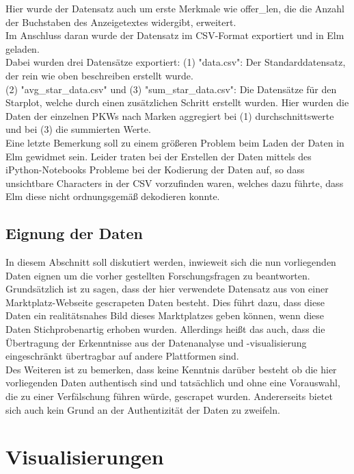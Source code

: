 \documentclass[usegeometry=true]{scrartcl}
\begin{document}
Hier wurde der Datensatz auch um erste Merkmale wie offer_len, die die Anzahl der Buchstaben des Anzeigetextes widergibt, erweitert. \\

Im Anschluss daran wurde der Datensatz im CSV-Format exportiert und in Elm geladen. \\
Dabei wurden drei Datensätze exportiert: (1) "data.csv": Der Standarddatensatz, der rein wie oben beschreiben erstellt wurde. \\
(2) "avg_star_data.csv" und (3) "sum_star_data.csv": Die Datensätze für den Starplot, welche durch einen zusätzlichen Schritt erstellt wurden. Hier wurden die Daten der einzelnen PKWs nach Marken aggregiert bei (1) durchschnittswerte und bei (3) die summierten Werte.\\
Eine letzte Bemerkung soll zu einem größeren Problem beim Laden der Daten in Elm gewidmet sein. Leider traten bei der Erstellen der Daten mittels des iPython-Notebooks Probleme bei der Kodierung der Daten auf, so dass unsichtbare Characters in der CSV vorzufinden waren, welches dazu führte, dass Elm diese nicht ordnungsgemäß dekodieren konnte. \\

\subsection{Eignung der Daten}

In diesem Abschnitt soll diskutiert werden, inwieweit sich die nun vorliegenden Daten eignen um die vorher gestellten Forschungsfragen zu beantworten. \\
Grundsätzlich ist zu sagen, dass der hier verwendete Datensatz aus von einer Marktplatz-Webseite gescrapeten Daten besteht. Dies führt dazu, dass diese Daten ein realitätsnahes Bild dieses Marktplatzes geben können, wenn diese Daten Stichprobenartig erhoben wurden. Allerdings heißt das auch, dass die Übertragung der Erkenntnisse aus der Datenanalyse und -visualisierung eingeschränkt übertragbar auf andere Plattformen sind. \\
Des Weiteren ist zu bemerken, dass keine Kenntnis darüber besteht ob die hier vorliegenden Daten authentisch sind und tatsächlich und ohne eine Vorauswahl, die zu einer Verfälschung führen würde, gescrapet wurden. Andererseits bietet sich auch kein Grund an der Authentizität der Daten zu zweifeln. \\



\section{Visualisierungen}
\end{document}
